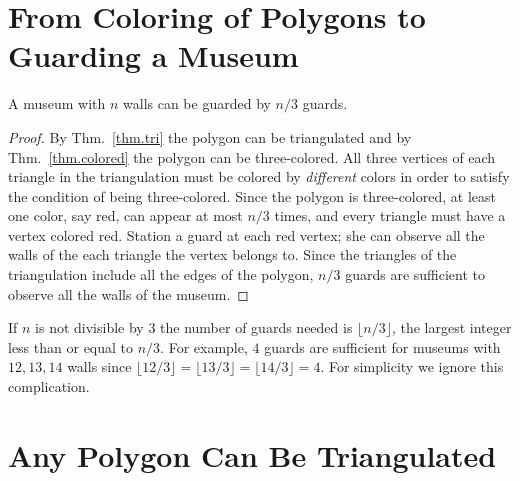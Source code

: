 \newpage

\section{From Coloring of Polygons to Guarding a Museum}\label{s.museum-guard}

\begin{theorem}\label{thm.guarded} A museum with $n$ walls can be guarded by $n/3$ guards.
\end{theorem}
\begin{proof}
By Thm.~\ref{thm.tri} the polygon can be triangulated and by Thm.~\ref{thm.colored} the polygon can be three-colored. All three vertices of each triangle in the triangulation must be colored by \emph{different} colors in order to satisfy the condition of being three-colored. Since the polygon is three-colored, at least one color, say red, can appear at most $n/3$ times, and every triangle must have a vertex colored red. Station a guard at each red vertex; she can observe all the walls of the each triangle the vertex belongs to. Since the triangles of the triangulation include all the edges of the polygon, $n/3$ guards are sufficient to observe all the walls of the museum.
\end{proof}
If $n$ is not divisible by $3$ the number of guards needed is $\lfloor n/3\rfloor$, the largest integer less than or equal to $n/3$. For example, $4$ guards are sufficient for museums with $12, 13, 14$ walls since $\lfloor 12/3\rfloor =\lfloor 13/3\rfloor=\lfloor 14/3\rfloor=4$. For simplicity we ignore this complication.
 
\section{Any Polygon Can Be Triangulated}\label{s.museum-triangulated}


